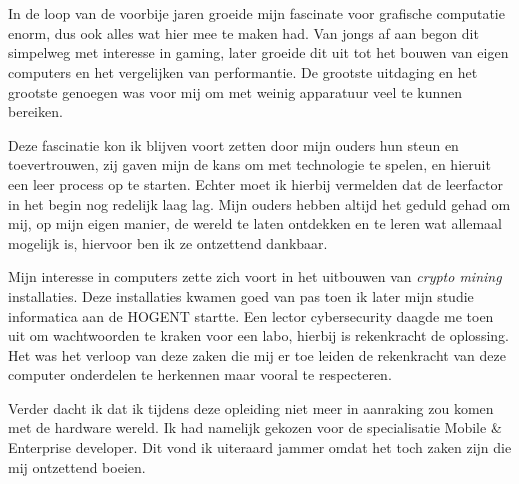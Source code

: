 
\chapter*{}%
\label{ch:voorwoord}


In de loop van de voorbije jaren groeide mijn fascinate voor grafische computatie enorm, dus ook alles wat hier mee te maken had. Van jongs af aan begon dit simpelweg met interesse in gaming, later groeide dit uit tot het bouwen van eigen computers en het vergelijken van performantie. De grootste uitdaging en het grootste genoegen was voor mij om met weinig apparatuur veel te kunnen bereiken. 

\bigbreak{}

Deze fascinatie kon ik blijven voort zetten door mijn ouders hun steun en toevertrouwen, zij gaven mijn de kans om met technologie te spelen, en hieruit een leer process op te starten. Echter moet ik hierbij vermelden dat de leerfactor in het begin nog redelijk laag lag. Mijn ouders hebben altijd het geduld gehad om mij, op mijn eigen manier, de wereld te laten ontdekken en te leren wat allemaal mogelijk is, hiervoor ben ik ze ontzettend dankbaar.

\bigbreak{}

Mijn interesse in computers zette zich voort in het uitbouwen van \textit{crypto mining} installaties. Deze installaties kwamen goed van pas toen ik later mijn studie informatica aan de HOGENT startte. Een lector cybersecurity daagde me toen uit om wachtwoorden te kraken voor een labo, hierbij is rekenkracht de oplossing. Het was het verloop van deze zaken die mij er toe leiden de rekenkracht van deze computer onderdelen te herkennen maar vooral te respecteren. 

\bigbreak{}

Verder dacht ik dat ik tijdens deze opleiding niet meer in aanraking zou komen met de hardware wereld. Ik had namelijk gekozen voor de specialisatie Mobile \& Enterprise developer. Dit vond ik uiteraard jammer omdat het toch zaken zijn die mij ontzettend boeien.

